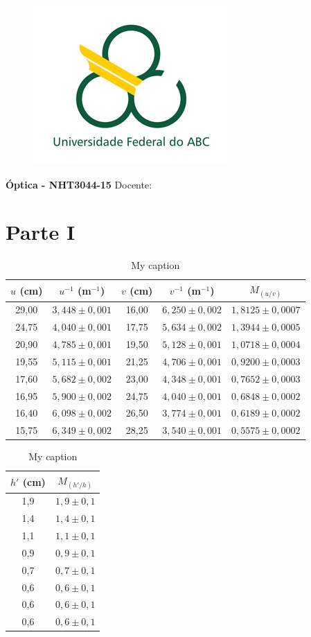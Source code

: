\documentclass[report,12pt,openright,oneside,a4paper,brazil]{abntex2}
\date{Março de 2019}
\renewcommand{\imprimircapa}{%
\begin{capa}%
	\begin{figure}[ht]
		\centering
		\includegraphics[scale=0.6]{logo.jpg}
		\label{fig:logo}
	\end{figure}
	\begin{center}
		\textbf{\large Óptica - NHT3044-15}
		\vfill
    	{\LARGE\textbf{\imprimirtitulo}}
    	\vfill
    	Docente: \imprimirorientador
    	\vspace*{1cm}
		\imprimirautor
		\vfill
    	\imprimirlocal \\
    	\imprimirdata
	\end{center}
\end{capa}
}
\begin{document}
\imprimircapa


\chapter{Parte I}

\begin{table}[H]
\centering
\caption{My caption}
\label{my-label2}
\begin{tabular}{|c|c|c|c|c|}
\hline
$u$ (cm) & $u^{-1}$ (m$^{-1}$) & $v$ (cm) & $v^{-1}$ (m$^{-1}$) & $M_{(u/v)}$ \\ \hline
29,00  &  $3,448 \pm 0,001$  &  16,00  &  $6,250 \pm 0,002$  &  $1,8125 \pm 0,0007$  \\ \hline
24,75  &  $4,040 \pm 0,001$  &  17,75  &  $5,634 \pm 0,002$  &  $1,3944 \pm 0,0005$  \\ \hline
20,90  &  $4,785 \pm 0,001$  &  19,50  &  $5,128 \pm 0,001$  &  $1,0718 \pm 0,0004$  \\ \hline
19,55  &  $5,115 \pm 0,001$  &  21,25  &  $4,706 \pm 0,001$  &  $0,9200 \pm 0,0003$  \\ \hline
17,60  &  $5,682 \pm 0,002$  &  23,00  &  $4,348 \pm 0,001$  &  $0,7652 \pm 0,0003$  \\ \hline
16,95  &  $5,900 \pm 0,002$  &  24,75  &  $4,040 \pm 0,001$  &  $0,6848 \pm 0,0002$  \\ \hline
16,40  &  $6,098 \pm 0,002$  &  26,50  &  $3,774 \pm 0,001$  &  $0,6189 \pm 0,0002$  \\ \hline
15,75  &  $6,349 \pm 0,002$  &  28,25  &  $3,540 \pm 0,001$  &  $0,5575 \pm 0,0002$  \\ \hline
\end{tabular}
\end{table}

\begin{table}[H]
\centering
\caption{My caption}
\label{my-label}
\begin{tabular}{|c|c|}
\hline
$h'$ (cm) & $M_{(h'/h)}$ \\ \hline
1,9  & $1,9 \pm 0,1$  \\ \hline
1,4  & $1,4 \pm 0,1$  \\ \hline
1,1  & $1,1 \pm 0,1$  \\ \hline
0,9  & $0,9 \pm 0,1$  \\ \hline
0,7  & $0,7 \pm 0,1$  \\ \hline
0,6  & $0,6 \pm 0,1$  \\ \hline
0,6  & $0,6 \pm 0,1$  \\ \hline
0,6  & $0,6 \pm 0,1$  \\ \hline
\end{tabular}
\end{table}
\end{document}
